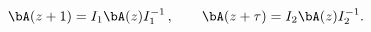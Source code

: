 \begin{equation}
\bA(z+1)=I_1 \bA(z) I^{-1}_1\,, \qquad
\bA(z+\tau)=I_2 \bA(z) I^{-1}_2.
\label{barA}
\end{equation}

